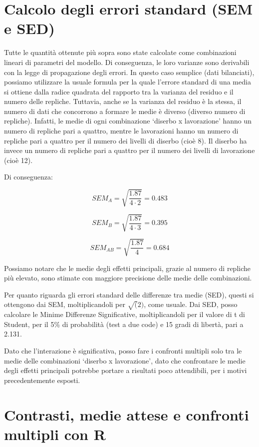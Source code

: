 \documentclass[a4paper,12pt,oneside]{book}
\theoremstyle{definition}
\theoremstyle{definition}
\theoremstyle{definition}
\theoremstyle{remark}
\begin{document}
\section{Calcolo degli errori standard (SEM e
SED)}\label{calcolo-degli-errori-standard-sem-e-sed}

Tutte le quantità ottenute più sopra sono state calcolate come
combinazioni lineari di parametri del modello. Di conseguenza, le loro
varianze sono derivabili con la legge di propagazione degli errori. In
questo caso semplice (dati bilanciati), possiamo utilizzare la usuale
formula per la quale l'errore standard di una media si ottiene dalla
radice quadrata del rapporto tra la varianza del residuo e il numero
delle repliche. Tuttavia, anche se la varianza del residuo è la stessa,
il numero di dati che concorrono a formare le medie è diverso (diverso
numero di repliche). Infatti, le medie di ogni combinazione `diserbo x
lavorazione' hanno un numero di repliche pari a quattro, mentre le
lavorazioni hanno un numero di repliche pari a quattro per il numero dei
livelli di diserbo (cioè 8). Il diserbo ha invece un numero di repliche
pari a quattro per il numero dei livelli di lavorazione (cioè 12).

Di conseguenza:

\[SEM_A = \sqrt{\frac{1.87}{4 \cdot 2}} = 0.483\]

\[SEM_B = \sqrt{\frac{1.87}{4 \cdot 3}} = 0.395\]

\[SEM_{AB} = \sqrt{\frac{1.87}{4}} = 0.684\]

Possiamo notare che le medie degli effetti principali, grazie al numero
di repliche più elevato, sono stimate con maggiore precisione delle
medie delle combinazioni.

Per quanto riguarda gli errori standard delle differenze tra medie
(SED), questi si ottengono dai SEM, moltiplicandoli per \(\sqrt(2)\),
come usuale. Dai SED, posso calcolare le Minime Differenze
Significative, moltiplicandoli per il valore di t di Student, per il 5\%
di probabilità (test a due code) e 15 gradi di libertà, pari a 2.131.

Dato che l'interazione è significativa, posso fare i confronti multipli
solo tra le medie delle combinazioni `diserbo x lavorazione', dato che
confrontare le medie degli effetti principali potrebbe portare a
risultati poco attendibili, per i motivi precedentemente esposti.

\section{Contrasti, medie attese e confronti multipli con
R}\label{contrasti-medie-attese-e-confronti-multipli-con-r}
\end{document}
